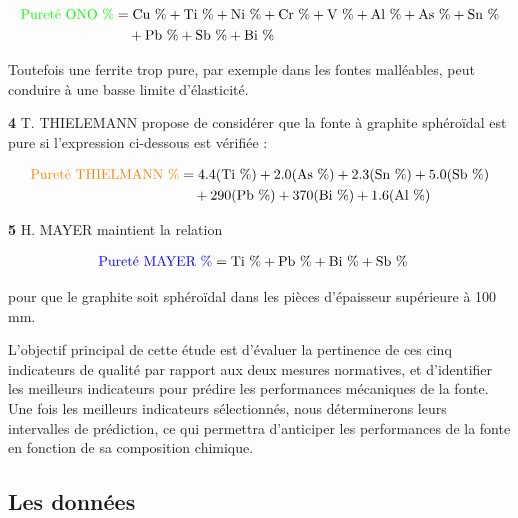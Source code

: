 \documentclass[12pt]{article}
\begin{document}
\begin{align*}
    \textcolor{green}{\text{Pureté ONO \%}} &= \text{Cu \%} + \text{Ti \%} + \text{Ni \%} + \text{Cr \%} + \text{V \%} + \text{Al \%} + \text{As \%} + \text{Sn \%} \\
    &\quad + \text{Pb \%} + \text{Sb \%} + \text{Bi \%}
\end{align*}

Toutefois une ferrite trop pure, par exemple dans les fontes malléables, 
peut conduire à une basse limite d'élasticité.



\textbf{4} T. THIELEMANN propose de considérer que la fonte à graphite 
sphéroïdal est pure si l'expression ci-dessous est vérifiée :

\begin{align*}
    \textcolor{orange}{\text{Pureté THIELMANN \%}} &= 4.4 (\text{Ti \%}) + 2.0 (\text{As \%}) + 2.3 (\text{Sn \%}) + 5.0 (\text{Sb \%}) \\
    &\quad + 290 (\text{Pb \%}) + 370 (\text{Bi \%}) + 1.6 (\text{Al \%})
\end{align*}


\textbf{5} H. MAYER maintient la relation

\begin{align*}
    \textcolor{blue}{\text{Pureté MAYER \%}} &= \text{Ti \%} + \text{Pb \%} + \text{Bi \%} + \text{Sb \%}
\end{align*}

pour que le graphite soit sphéroïdal dans les pièces d’épaisseur supérieure
à 100 mm.


L'objectif principal de cette étude est d'évaluer la pertinence de ces 
cinq indicateurs de qualité par rapport aux deux mesures normatives, et 
d'identifier les meilleurs indicateurs pour prédire les performances 
mécaniques de la fonte. Une fois les meilleurs indicateurs sélectionnés, 
nous déterminerons leurs intervalles de prédiction, ce qui permettra 
d'anticiper les performances de la fonte en fonction de sa composition 
chimique.









\subsection{Les données}
\end{document}
